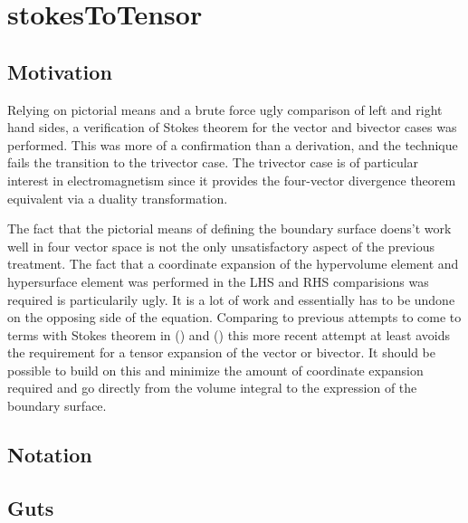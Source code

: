 

\chapter{stokesToTensor}
\label{chap:stokesToTensor}
\date{July 21, 2009}

\beginArtWithToc

\section{Motivation}

Relying on pictorial means and a brute force ugly comparison of left and right hand sides, a verification of Stokes theorem for the vector and bivector cases was performed.  This was more of a confirmation than a derivation, and the technique fails the transition to the trivector case.  The trivector case is of particular interest in electromagnetism since it provides the four-vector divergence theorem equivalent via a duality transformation.

The fact that the pictorial means of defining the boundary surface doens't work well in four vector space is not the only unsatisfactory aspect of the previous treatment.  The fact that a coordinate expansion of the hypervolume element and hypersurface element was performed in the LHS and RHS comparisions was required is particularily ugly.  It is a lot of work and essentially has to be undone on the opposing side of the equation.  Comparing to previous attempts to come to terms with Stokes theorem in (\cite{PJStokes1}) and (\cite{PJStokes2}) this more recent attempt at least avoids the requirement for a tensor expansion of the vector or bivector.  It should be possible to build on this and minimize the amount of coordinate expansion required and go directly from the volume integral to the expression of the boundary surface.

\section{Notation}


\section{Guts}

\EndArticle

